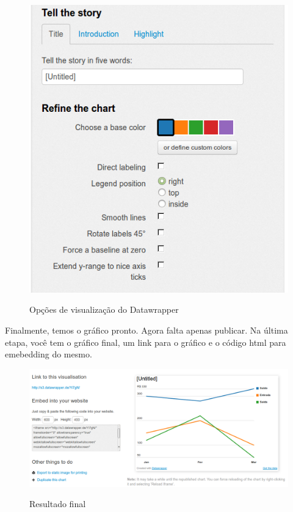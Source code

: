 \documentclass[12pt,onecolumn]{article}
\begin{document}
    \begin{figure}[H]
      \begin{center}
        \includegraphics[scale = 0.4]{datawrapper-optvis.png}
        \label{fig:datawrapper-optvis}
        \caption{Opções de visualização do Datawrapper}
      \end{center}
    \end{figure}
    
    Finalmente, temos o gráfico pronto. Agora falta apenas publicar. Na última etapa,
    você tem o gráfico final, um link para o gráfico e o código html para emebedding
    do mesmo.
    
    \begin{figure}[H]
      \begin{center}
        \includegraphics[width=.9\linewidth]{datawrapper-final.png}
        \label{fig:datawrapper-final}
        \caption{Resultado final}
      \end{center}
    \end{figure}
    
\end{document}
